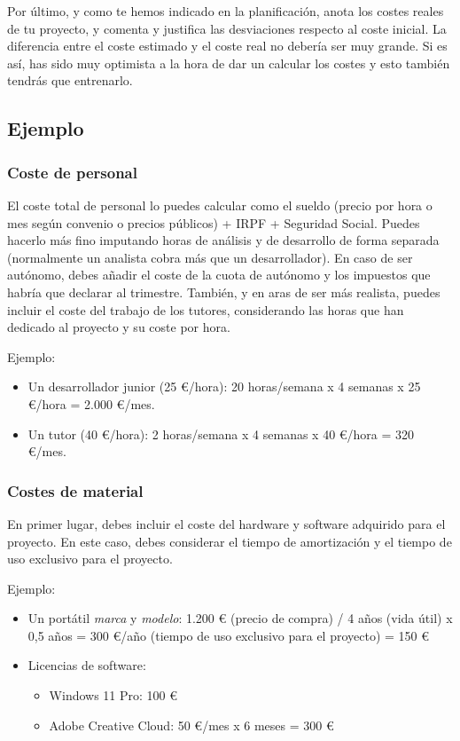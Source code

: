 Por último, y como te hemos indicado en la planificación, anota los costes reales de tu proyecto, y comenta y justifica las desviaciones respecto al coste inicial. La diferencia entre el coste estimado y el coste real no debería ser muy grande. Si es así, has sido muy optimista a la hora de dar un calcular los costes y esto también tendrás que entrenarlo.

\subsection{Ejemplo}

\subsubsection{Coste de personal}

El coste total de personal lo puedes calcular como el sueldo (precio por hora o mes según convenio o precios públicos) + IRPF + Seguridad Social. Puedes hacerlo más fino imputando horas de análisis y de desarrollo de forma separada (normalmente un analista cobra más que un desarrollador). En caso de ser autónomo, debes añadir el coste de la cuota de autónomo y los impuestos que habría que declarar al trimestre. También, y en aras de ser más realista, puedes incluir el coste del trabajo de los tutores, considerando las horas que han dedicado al proyecto y su coste por hora. 

Ejemplo:
\begin{itemize}
\item Un desarrollador junior (25 €/hora): 20 horas/semana x 4 semanas x 25 €/hora = 2.000 €/mes.
\item Un tutor (40 €/hora): 2 horas/semana x 4 semanas x 40 €/hora = 320 €/mes.
\end{itemize}

\subsubsection{Costes de material}

En primer lugar, debes incluir el coste del hardware y software adquirido para el proyecto. En este caso, debes considerar el tiempo de amortización y el tiempo de uso exclusivo para el proyecto.

Ejemplo:

\begin{itemize}
  
\item Un portátil \textit{marca} y \textit{modelo}: 1.200 € (precio de compra) / 4 años (vida útil) x 0,5 años = 300 €/año  (tiempo de uso exclusivo para el proyecto) = 150 €

\item Licencias de software: 
    \begin{itemize}
    \item Windows 11 Pro: 100 €
    \item Adobe Creative Cloud: 50 €/mes x 6 meses = 300 €
    \end{itemize}
\end{itemize}


